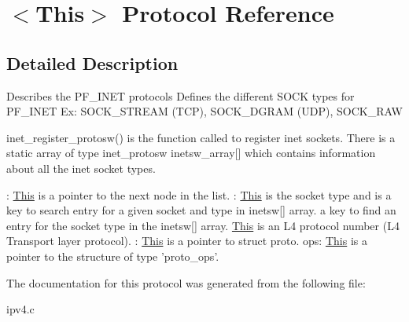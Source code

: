 \hypertarget{protocolThis-p}{\section{$<$This$>$ Protocol Reference}
\label{protocolThis-p}
}


\subsection{Detailed Description}
Describes the P\-F\-\_\-\-I\-N\-E\-T protocols Defines the different S\-O\-C\-K types for P\-F\-\_\-\-I\-N\-E\-T Ex\-: S\-O\-C\-K\-\_\-\-S\-T\-R\-E\-A\-M (T\-C\-P), S\-O\-C\-K\-\_\-\-D\-G\-R\-A\-M (U\-D\-P), S\-O\-C\-K\-\_\-\-R\-A\-W

inet\-\_\-register\-\_\-protosw() is the function called to register inet sockets. There is a static array of type inet\-\_\-protosw inetsw\-\_\-array\mbox{[}\mbox{]} which contains information about all the inet socket types.

\-: \hyperlink{protocolThis-p}{This} is a pointer to the next node in the list. \-: \hyperlink{protocolThis-p}{This} is the socket type and is a key to search entry for a given socket and type in inetsw\mbox{[}\mbox{]} array. a key to find an entry for the socket type in the inetsw\mbox{[}\mbox{]} array. \hyperlink{protocolThis-p}{This} is an L4 protocol number (L4 Transport layer protocol). \-: \hyperlink{protocolThis-p}{This} is a pointer to struct proto. ops\-: \hyperlink{protocolThis-p}{This} is a pointer to the structure of type 'proto\-\_\-ops'. 

The documentation for this protocol was generated from the following file\-:\begin{DoxyCompactItemize}
\item 
ipv4.\-c\end{DoxyCompactItemize}
